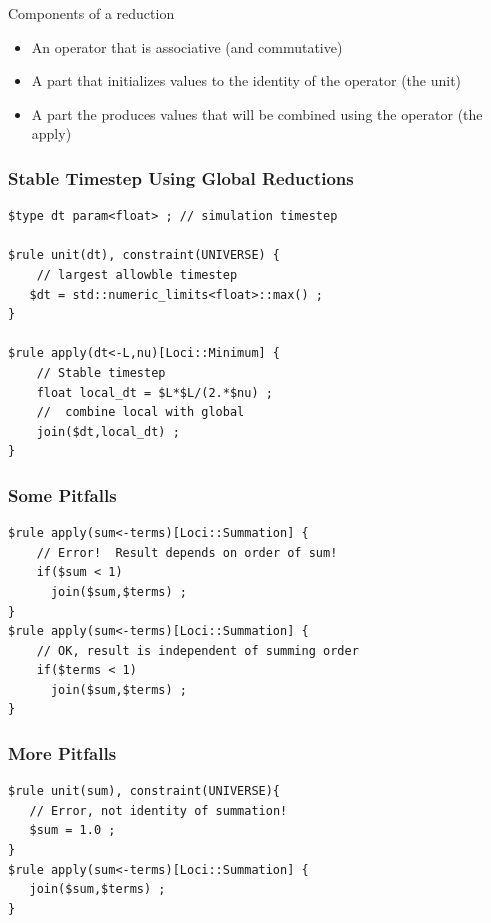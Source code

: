 \documentclass{beamer}
\begin{document}
\begin{frame}{Components of a reduction}
\begin{itemize}
\item An operator that is associative (and commutative)
\item A part that initializes values to the identity of the operator (the unit)
\item A part the produces values that will be combined using the operator (the apply)
\end{itemize}
\end{frame}
\begin{frame}[fragile=singleslide]\frametitle{Stable Timestep Using Global Reductions}
\begin{verbatim}
$type dt param<float> ; // simulation timestep

$rule unit(dt), constraint(UNIVERSE) {
    // largest allowble timestep
   $dt = std::numeric_limits<float>::max() ;
}

$rule apply(dt<-L,nu)[Loci::Minimum] {
    // Stable timestep
    float local_dt = $L*$L/(2.*$nu) ;  
    //  combine local with global
    join($dt,local_dt) ; 
}
\end{verbatim}
\end{frame}
\begin{frame}[fragile=singleslide]\frametitle{Some Pitfalls}
\begin{verbatim}
$rule apply(sum<-terms)[Loci::Summation] {
    // Error!  Result depends on order of sum!
    if($sum < 1) 
      join($sum,$terms) ; 
}
$rule apply(sum<-terms)[Loci::Summation] {
    // OK, result is independent of summing order
    if($terms < 1) 
      join($sum,$terms) ; 
}
\end{verbatim}
\end{frame}
\begin{frame}[fragile=singleslide]\frametitle{More Pitfalls}
\begin{verbatim}
$rule unit(sum), constraint(UNIVERSE){
   // Error, not identity of summation!
   $sum = 1.0 ;
}
$rule apply(sum<-terms)[Loci::Summation] {
   join($sum,$terms) ; 
}
\end{verbatim}
\end{frame}
\end{document}
